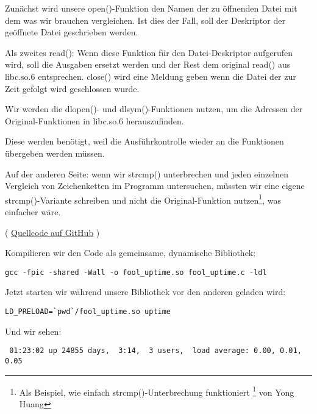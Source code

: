 Zunächst wird unsere open()-Funktion den Namen der zu öffnenden Datei mit dem was
wir brauchen vergleichen. Ist dies der Fall, soll der Deskriptor der geöffnete Datei
geschrieben werden.

Als zweites read(): Wenn diese Funktion für den Datei-Deskriptor aufgerufen wird,
soll die Ausgaben ersetzt werden und der Rest dem original read() aus libc.so.6
entsprechen.
close() wird eine Meldung geben wenn die Datei der zur Zeit gefolgt wird geschlossen
wurde.


Wir werden die dlopen()- und dlsym()-Funktionen nutzen, um die Adressen der Original-Funktionen
in libc.so.6 herauszufinden.

Diese werden benötigt, weil die Ausführkontrolle wieder an die  Funktionen
übergeben werden müssen.


Auf der anderen Seite: wenn wir strcmp() unterbrechen und jeden einzelnen Vergleich
von Zeichenketten im Programm untersuchen, müssten wir eine eigene strcmp()-Variante
schreiben und nicht die Original-Funktion
nutzen\footnote{Als Beispiel, wie einfach strcmp()-Unterbrechung funktioniert
\footnote{\href{http://go.yurichev.com/17143}{yurichev.com}} von Yong Huang}, was
einfacher wäre.


( \href{https://github.com/DennisYurichev/RE-for-beginners/blob/master/OS/LD_PRELOAD/fool_uptime.c}{Quellcode auf GitHub} )

Kompilieren wir den Code als gemeinsame, dynamische Bibliothek:

\begin{lstlisting}
gcc -fpic -shared -Wall -o fool_uptime.so fool_uptime.c -ldl
\end{lstlisting}

Jetzt starten wir  während unsere Bibliothek vor den anderen geladen wird:

\begin{lstlisting}
LD_PRELOAD=`pwd`/fool_uptime.so uptime
\end{lstlisting}

Und wir sehen:

\begin{lstlisting}
 01:23:02 up 24855 days,  3:14,  3 users,  load average: 0.00, 0.01, 0.05
\end{lstlisting}

